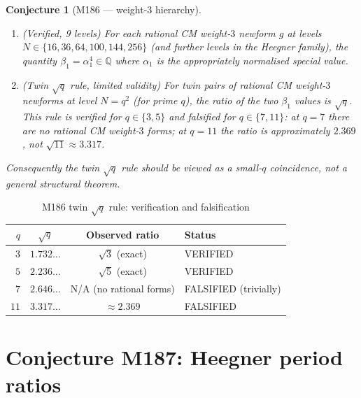 \documentclass[12pt]{amsart}
\newtheorem{conjecture}[theorem]{Conjecture}
\theoremstyle{definition}
\newcommand{\Q}{\mathbb{Q}}
\begin{document}
\begin{conjecture}[M186 --- weight-$3$ hierarchy]
  \label{conj:M186}
  \leavevmode
  \begin{enumerate}
    \item \textup{(Verified, 9 levels)} For each rational CM weight-$3$ newform $g$ at
      levels $N \in \{16, 36, 64, 100, 144, 256\}$ (and further levels in the
      Heegner family), the quantity $\beta_1 = \alpha_1^4 \in \Q$ where
      $\alpha_1$ is the appropriately normalised special value.

    \item \textup{(Twin $\sqrt{q}$ rule, limited validity)} For twin pairs of rational
      CM weight-$3$ newforms at level $N = q^2$ (for prime $q$), the ratio
      of the two $\beta_1$ values is $\sqrt{q}$.
      This rule is \emph{verified} for $q \in \{3, 5\}$
      and \emph{falsified} for $q \in \{7, 11\}$:
      at $q = 7$ there are no rational CM weight-$3$ forms;
      at $q = 11$ the ratio is approximately $2.369$, not $\sqrt{11} \approx 3.317$.
  \end{enumerate}
  Consequently the twin $\sqrt{q}$ rule should be viewed as a small-$q$
  coincidence, not a general structural theorem.
\end{conjecture}

\begin{table}[h]
  \caption{M186 twin $\sqrt{q}$ rule: verification and falsification}
  \label{tab:M186}
  \renewcommand{\arraystretch}{1.25}
  \begin{tabular}{rccl}
    \toprule
    $q$ & $\sqrt{q}$ & Observed ratio & Status \\
    \midrule
    $3$ & $1.732\ldots$ & $\sqrt{3}$ (exact) & VERIFIED \\
    $5$ & $2.236\ldots$ & $\sqrt{5}$ (exact) & VERIFIED \\
    $7$ & $2.646\ldots$ & N/A (no rational forms) & FALSIFIED (trivially) \\
    $11$& $3.317\ldots$ & $\approx 2.369$ & FALSIFIED \\
    \bottomrule
  \end{tabular}
\end{table}

\section{Conjecture M187: Heegner period ratios}
\label{sec:M187}
\end{document}
